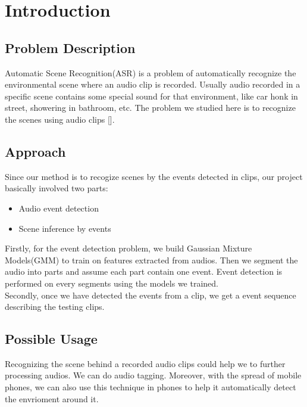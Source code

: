 
\chapter{Introduction}

\section{Problem Description}
Automatic Scene Recognition(ASR) is a problem of automatically recognize the environmental scene where an audio clip is recorded. Usually audio recorded in a specific scene contains some special sound for that environment, like car honk in street, showering in bathroom, etc. The problem we studied here is to recognize the scenes using audio clips [\cite{IEEE-1363}].   

\section{Approach}
Since our method is to recogize scenes by the events detected in clips, our project basically involved two parts: 
\begin{itemize}
\item{Audio event detection}
\item{Scene inference by events}
\end{itemize}
Firstly, for the event detection problem, we build Gaussian Mixture Models(GMM) to train on features extracted from audios. Then we segment the audio into parts and assume each part contain one event. Event detection is performed on every segments using the models we trained.\\
Secondly, once we have detected the events from a clip, we get a event sequence describing the testing clips. 

\section{Possible Usage}
Recognizing the scene behind a recorded audio clips could help we to further processing audios. We can do audio tagging. Moreover, with the spread of mobile phones, we can also use this technique in phones to help it automatically detect the envrioment around it. 


